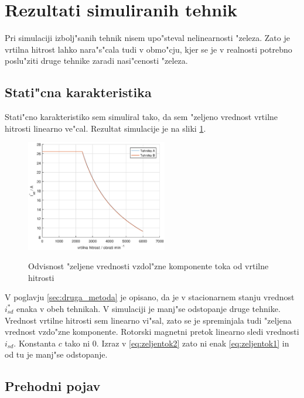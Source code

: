 \documentclass[journal,a4paper,twoside]{sty/IEEEtran}
\begin{document}
\section{Rezultati simuliranih tehnik}

Pri simulaciji izbolj"sanih tehnik nisem upo"steval nelinearnosti "zeleza. Zato je vrtilna hitrost lahko nara"s"cala tudi v obmo"cju, kjer se je v realnosti potrebno poslu"ziti druge tehnike zaradi nasi"cenosti "zeleza.

\subsection{Stati"cna karakteristika}

Stati"cno karakteristiko sem simuliral tako, da sem "zeljeno vrednost vrtilne hitrosti linearno ve"cal. Rezultat simulacije je na sliki \ref{fig:static}.

\begin{figure}
\includegraphics[width=0.55\textwidth]{fig_static.eps}
\label{fig:static}
\caption{Odvisnost "zeljene vrednosti vzdol"zne komponente toka od vrtilne hitrosti}
\end{figure}

V poglavju \ref{sec:druga_metoda} je opisano, da je v stacionarnem stanju vrednost $i_{sd}^*$ enaka v obeh tehnikah. V simulaciji je manj"se odstopanje druge tehnike. Vrednost vrtilne hitrosti sem linearno vi"sal, zato se je spreminjala tudi "zeljena vrednost vzdo"zne komponente. Rotorski magnetni pretok  linearno sledi vrednosti $i_{sd}$. Konstanta $c$ tako ni 0. Izraz v \ref{eq:zeljentok2} zato ni enak \ref{eq:zeljentok1} in od tu je manj"se odstopanje.

\subsection{Prehodni pojav}
\end{document}
